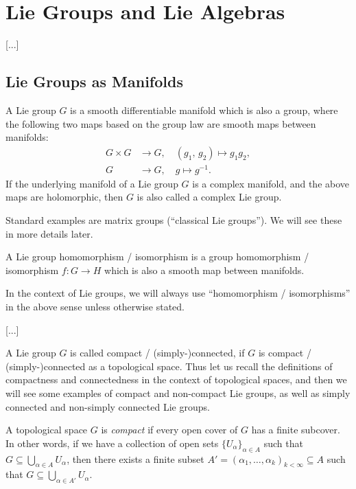 \chapter{Lie Groups and Lie Algebras}

 [...]

\section{Lie Groups as Manifolds}

\begin{definition}
    A Lie group \(G\) is a smooth differentiable manifold which is also a group, where the following two maps based on the group law are smooth maps between manifolds:
    \[
        \begin{aligned}
            G \times G & \to G, \quad (g_1,\,g_2) \mapsto g_1g_2, \\
            G          & \to G, \quad g \mapsto g^{-1}.
        \end{aligned}
    \]
    If the underlying manifold of a Lie group \(G\) is a complex manifold, and the above maps are holomorphic, then \(G\) is also called a complex Lie group.
\end{definition}

Standard examples are matrix groups (“classical Lie groups”). We will see these in more details later.

\begin{definition}
    A Lie group homomorphism / isomorphism is a group homomorphism / isomorphism \(f : G \to H\) which is also a smooth map between manifolds.
\end{definition}
In the context of Lie groups, we will always use ``homomorphism / isomorphisms'' in the above sense unless otherwise stated.

\begin{example}[example 1.2.3]
    [...]

    [...]
\end{example}

A Lie group \(G\) is called compact / (simply-)connected, if \(G\) is compact / (simply-)connected as a topological space. Thus let us recall the definitions of compactness and connectedness in the context of topological spaces, and then we will see some examples of compact and non-compact Lie groups, as well as simply connected and non-simply connected Lie groups.

\begin{definition}
    A topological space \(G\) is \textit{compact} if every open cover of \(G\) has a finite subcover. In other words, if we have a collection of open sets \(\{U_{\alpha}\}_{\alpha \in A}\) such that \(G \subseteq \bigcup_{\alpha \in A} U_{\alpha}\), then there exists a finite subset \(A' = (\alpha_1, \ldots, \alpha_k)_{k < \infty} \subseteq A\) such that \(G \subseteq \bigcup_{\alpha \in A'} U_{\alpha}\).
\end{definition}

